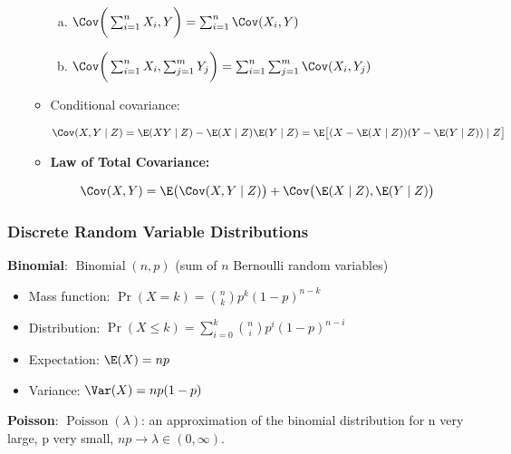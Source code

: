 \begin{itemize}
\begin{itemize}
\begin{theorem}
\begin{enumerate}[(a)]
\item \(\Cov\bigg( \sum_{i=1}^n X_i , Y\bigg) = \sum_{i=1}^n \Cov(X_i, Y)\)

\item \(\Cov\bigg( \sum_{i=1}^n X_i, \sum_{j=1}^m Y_j \bigg) = \sum_{i=1}^n \sum_{j=1}^m \Cov(X_i, Y_j)
\)

\end{enumerate}
\end{theorem}

\item \begin{definition} Conditional covariance: 

\[
\Cov(X, Y \mid Z) = \E(XY \mid Z) - \E(X \mid Z) \E(Y \mid Z) = \E \big[ (X - \E(X \mid Z))(Y - \E(Y \mid Z)) \mid Z\big]
\] \end{definition}

\item \begin{theorem} \textbf{Law of Total Covariance:}

\[
\Cov(X, Y) = \E\big(\Cov(X, Y \mid Z) \big) + \Cov \big(\E(X \mid Z), \E(Y \mid Z) \big)
\]
\end{theorem}

\end{itemize}

\end{itemize}

\subsubsection{Discrete Random Variable Distributions}

\textbf{Binomial}: \(\operatorname{Binomial}(n, p)\) (sum of \(n\) Bernoulli random variables)

\begin{itemize}

\item Mass function: \(\Pr(X = k) = \binom{n}{k}p^k(1-p)^{n-k}  \)

\item Distribution: \(\Pr(X \leq k) = \sum_{i=0}^k \binom{n}{i}p^i(1-p)^{n-i} \)

\item Expectation: \(\E(X) = np \)

\item Variance: \(\Var(X) = np(1-p) \)

\end{itemize}

\textbf{Poisson}:  \(\operatorname{Poisson}(\lambda)\): an approximation of the binomial distribution for n very large, p very small, \(np \to \lambda \in (0, \infty)\).

